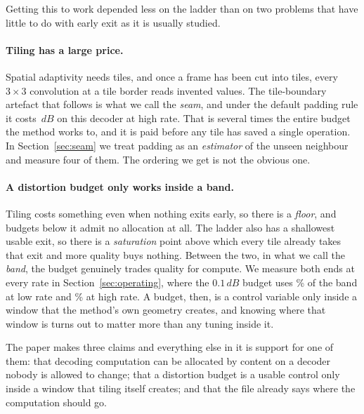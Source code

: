 \documentclass[10pt,twocolumn,letterpaper]{article}
\newcommand{\dB}{\,dB}
\begin{document}
Getting this to work depended less on the ladder than on two problems that have
little to do with early exit as it is usually studied.

\paragraph{Tiling has a large price.} Spatial adaptivity needs tiles, and once a
frame has been cut into tiles, every $3\times3$ convolution at a tile border
reads invented values. The tile-boundary artefact that follows is what we call
the \emph{seam}, and under the default padding rule it costs
\SeamZerosHigh$\dB$ on this decoder at high rate. That is several times the entire
budget the method works to, and it is paid before any tile has saved a single
operation. In Section~\ref{sec:seam} we treat padding as an \emph{estimator} of
the unseen neighbour and measure four of them. The ordering we get is not the
obvious one.

\paragraph{A distortion budget only works inside a band.} Tiling costs something
even when nothing exits early, so there is a \emph{floor}, and budgets below it
admit no allocation at all. The ladder also has a shallowest usable exit, so
there is a \emph{saturation} point above which every tile already takes that
exit and more quality buys nothing. Between the two, in what we call the
\emph{band}, the budget genuinely trades quality for compute. We measure both
ends at every rate in Section~\ref{sec:operating}, where the $0.1\dB$ budget
uses \BandUseLow\% of the band at low rate and \BandUseHigh\% at high rate. A budget, then, is a control variable only inside a
window that the method's own geometry creates, and knowing where that window is
turns out to matter more than any tuning inside it.

The paper makes three claims and everything else in it is support for one of
them: that decoding computation can be allocated by content on a decoder nobody
is allowed to change; that a distortion budget is a usable control only inside a
window that tiling itself creates; and that the file already says where the
computation should go.
\end{document}
